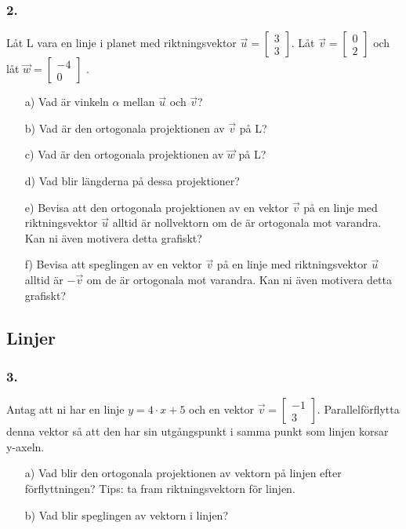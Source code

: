\documentclass{article}
\begin{document}
\subsubsection*{2.}
Låt L vara en linje i planet med riktningsvektor $\vec{u} = \begin{bmatrix} 3 \\ 3 \end{bmatrix}$. Låt $\vec{v} = \begin{bmatrix} 0 \\ 2 \end{bmatrix}$ och låt $\vec{w} = \begin{bmatrix} -4 \\ 0 \end{bmatrix}$ .
\begin{itemize}
\item[a) ] Vad är vinkeln $\alpha$ mellan $\vec{u}$ och $\vec{v}$?
\item[b) ] Vad är den ortogonala projektionen av $\vec{v}$ på L?
\item[c) ] Vad är den ortogonala projektionen av $\vec{w}$ på L?
\item[d) ] Vad blir längderna på dessa projektioner?
\item[e) ] Bevisa att den ortogonala projektionen av en vektor $\vec{v}$ på en linje med riktningsvektor $\vec{u}$ alltid är nollvektorn om de är ortogonala mot varandra. Kan ni även motivera detta grafiskt? 
\item[f) ] Bevisa att speglingen av en vektor $\vec{v}$ på en linje med riktningsvektor $\vec{u}$ alltid är $-\vec{v}$ om de är ortogonala mot varandra. Kan ni även motivera detta grafiskt?
\end{itemize}   

\subsection*{Linjer}
\subsubsection*{3.}
Antag att ni har en linje $y = 4 \cdot x + 5$ och en vektor $\vec{v} = \begin{bmatrix} -1 \\ 3 \end{bmatrix}$. Parallelförflytta denna vektor så att den har sin utgångspunkt i samma punkt som linjen korsar y-axeln.
\begin{itemize}
\item[a) ] Vad blir den ortogonala projektionen av vektorn på linjen efter förflyttningen? Tips: ta fram riktningsvektorn för linjen. 
\item[b) ] Vad blir speglingen av vektorn i linjen?
\end{itemize}
\end{document}

